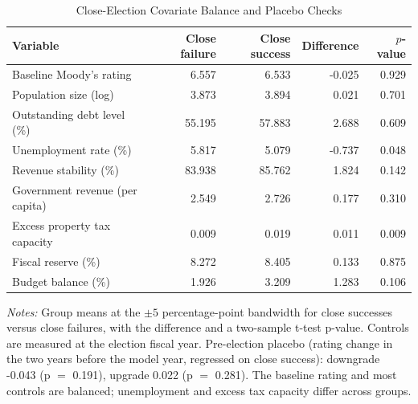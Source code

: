 \begin{table}[!htbp]
\centering
\caption{Close-Election Covariate Balance and Placebo Checks}
\label{tab:post_northeast_rdd_balance}
\small
\begin{tabular}{lrrrr}
\toprule
Variable & Close failure & Close success & Difference & $p$-value \\
\midrule
Baseline Moody's rating & 6.557 & 6.533 & -0.025 & 0.929 \\
Population size (log) & 3.873 & 3.894 & 0.021 & 0.701 \\
Outstanding debt level (\%) & 55.195 & 57.883 & 2.688 & 0.609 \\
Unemployment rate (\%) & 5.817 & 5.079 & -0.737 & 0.048 \\
Revenue stability (\%) & 83.938 & 85.762 & 1.824 & 0.142 \\
Government revenue (per capita) & 2.549 & 2.726 & 0.177 & 0.310 \\
Excess property tax capacity & 0.009 & 0.019 & 0.011 & 0.009 \\
Fiscal reserve (\%) & 8.272 & 8.405 & 0.133 & 0.875 \\
Budget balance (\%) & 1.926 & 3.209 & 1.283 & 0.106 \\
\bottomrule
\end{tabular}
\vspace{0.05in}
\begin{minipage}{0.96\textwidth}\footnotesize\emph{Notes:} Group means at the $\pm 5$ percentage-point bandwidth for close successes versus close failures, with the difference and a two-sample t-test p-value. Controls are measured at the election fiscal year. Pre-election placebo (rating change in the two years before the model year, regressed on close success): downgrade -0.043 (p $=$ 0.191), upgrade 0.022 (p $=$ 0.281). The baseline rating and most controls are balanced; unemployment and excess tax capacity differ across groups.\end{minipage}
\end{table}
